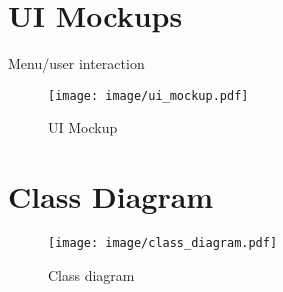 \documentclass[11pt]{article}
\begin{document}
%

\newpage
\section{UI Mockups}
Menu/user interaction

\begin{figure}[htb]
 \centering
     {\texttt{[image: image/ui\_mockup.pdf]}}
    \vspace{-2ex}
     \caption{\label{fig:ui_mock}  
       UI Mockup 
     }
\end{figure}

\newpage
\section{Class Diagram}
\begin{figure}[htb]
 \centering
     {\texttt{[image: image/class\_diagram.pdf]}}
    \vspace{-2ex}
     \caption{\label{fig:class_diagram}  
        Class diagram
     }
\end{figure}



\end{document}
